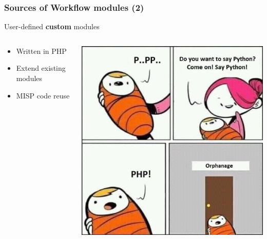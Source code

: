 \begin{frame}
    \frametitle{Sources of Workflow modules (2)}
    User-defined \textbf{custom} modules
    \vspace*{0.5em}
    \begin{columns}
        \begin{column}{0.5\textwidth}
            \begin{itemize}
                \item Written in PHP
                \item Extend existing modules
                \item MISP code reuse
            \end{itemize}
        \end{column}
        \begin{column}{0.5\textwidth}
            \includegraphics[width=1.0\linewidth]{pictures/php-joke.jpg}
        \end{column}
    \end{columns}
\end{frame}

